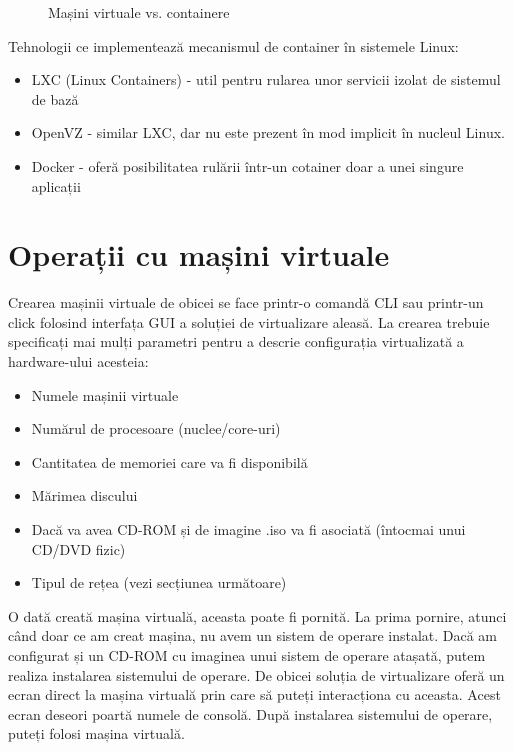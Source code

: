 \begin{figure}[htbp]
	\centering
	\def\svgwidth{\columnwidth}
	
	\caption{Mașini virtuale vs. containere}
	\label{fig:vm-vmcontainer}
\end{figure}

Tehnologii ce implementează mecanismul de container în sistemele Linux:

\begin{itemize}
	\item LXC  (Linux Containers) - util pentru
		rularea unor servicii izolat de sistemul de bază
	\item OpenVZ - similar LXC, dar nu este prezent în mod implicit în
		nucleul Linux.
	\item Docker - oferă posibilitatea rulării într-un cotainer doar a unei
		singure aplicații
\end{itemize}

\section{Operații cu mașini virtuale}
\label{sec:vm-ops}

Crearea mașinii virtuale de obicei se face printr-o comandă CLI sau printr-un
click folosind interfața GUI a soluției de virtualizare aleasă. La crearea
trebuie specificați mai mulți parametri pentru a descrie configurația
virtualizată a hardware-ului acesteia:

\begin{itemize}
	\item Numele mașinii virtuale
	\item Numărul de procesoare (nuclee/core-uri)
	\item Cantitatea de memoriei care va fi disponibilă
	\item Mărimea discului
	\item Dacă va avea CD-ROM și de imagine .iso va fi asociată (întocmai
		unui CD/DVD fizic)
	\item Tipul de rețea (vezi secțiunea următoare)
\end{itemize}

O dată creată mașina virtuală, aceasta poate fi pornită. La prima pornire,
atunci când doar ce am creat mașina, nu avem un sistem de operare instalat. Dacă
am configurat și un CD-ROM cu imaginea unui sistem de operare atașată, putem
realiza instalarea sistemului de operare. De obicei soluția de virtualizare
oferă un ecran direct la mașina virtuală prin care să puteți interacționa cu
aceasta. Acest ecran deseori poartă numele de consolă. După instalarea
sistemului de operare, puteți folosi mașina virtuală.

